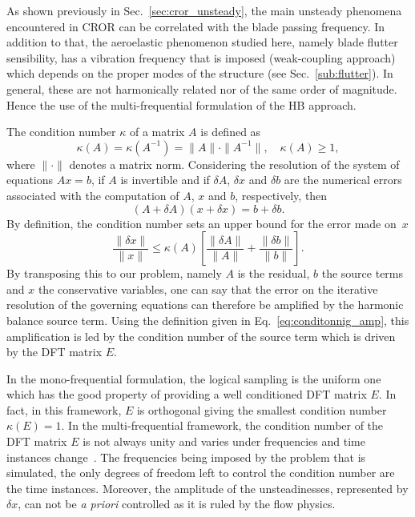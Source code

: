 
As shown previously in Sec.~\ref{sec:cror_unsteady}, the main unsteady
phenomena encountered in CROR can be correlated with the blade passing
frequency.
In addition to that, the aeroelastic phenomenon
studied here, namely blade flutter sensibility, has a vibration frequency that
is imposed (weak-coupling approach) which depends on the proper modes
of the structure (see Sec.~\ref{sub:flutter}).
In general, these are not harmonically related nor
of the same order of magnitude. Hence the use of the
multi-frequential formulation of the HB approach. 

The condition number $\kappa$ of a matrix $A$ is defined as
\begin{equation}
  \kappa (A) = \kappa (A^{-1}) = \| A \| \cdot \| A^{-1} \|, \quad
    \kappa(A) \geq 1,
\end{equation}
where $\| \cdot \|$ denotes a matrix norm. Considering the resolution
of the system of equations
$A x = b$, if $A$ is invertible and if $\delta A$, $\delta x$ and
$\delta b$ are the numerical errors associated with the computation of
$A$, $x$ and $b$, respectively, then
\begin{equation}
   (A + \delta A)(x + \delta x) = b + \delta b.
   \label{eq:error_reso}
\end{equation}
By definition, the condition number sets an upper bound for 
the error made on~$x$
\begin{equation}
   \frac{\| \delta x \|}{\| x \|} \leq 
   \kappa(A)\left[\frac{\| \delta A \|}{\| A \|} + 
   \frac{\| \delta b \|}{\| b \|} \right].
   \label{eq:conditonnig_amp}
\end{equation}
By transposing this to our problem, namely $A$ is the residual, 
$b$ the source terms and $x$ the conservative variables, one can say that
the error on the iterative resolution of the governing equations can
therefore be amplified by the harmonic balance source term.
Using the definition given in Eq.~\eqref{eq:conditonnig_amp}, this amplification is
led by the condition number of the source term which
is driven by the DFT matrix $E$. 


In the mono-frequential formulation, the logical sampling is the uniform one
which has the good property of providing
a well conditioned DFT matrix $E$. In fact, in this framework, $E$ is orthogonal giving 
the smallest condition number $\kappa (E) = 1$.
In the multi-frequential framework,
the condition number of the DFT matrix $E$ is not always unity and
varies under frequencies and time instances change~\cite{Kundert1988}. 
The frequencies
being imposed by the problem that is simulated,
the only degrees of freedom left to control the condition
number are the time instances. 
Moreover, the amplitude of the unsteadinesses, represented by $\delta x$,
can not be \emph{a priori} controlled as it is ruled by the flow physics. 

